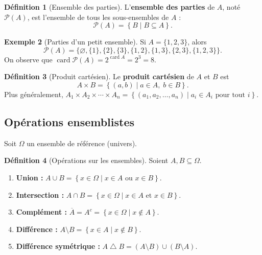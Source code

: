 \documentclass[12pt,a4paper,openany]{book}
\theoremstyle{definition}
\newtheorem{definition}{Définition}[chapter]
\newtheorem{exemple}[definition]{Exemple}
\theoremstyle{plain}
\theoremstyle{remark}
\newcommand{\set}[1]{\left\{#1\right\}}
\newcommand{\powerset}{\mathcal{P}}
\DeclareMathOperator{\card}{card}
\begin{document}
\begin{definition}[Ensemble des parties]\label{def:powerset}
\index{powerset@$\powerset$}
L'\textbf{ensemble des parties} de $A$, noté $\powerset(A)$, est
l'ensemble de tous les sous-ensembles de $A$ :
\[
  \powerset(A) = \set{B \mid B \subseteq A}.
\]
\end{definition}

\begin{exemple}[Parties d'un petit ensemble]\label{ex:parties}
Si $A = \{1, 2, 3\}$, alors
\[
  \powerset(A) = \bigl\{\varnothing, \{1\}, \{2\}, \{3\}, \{1,2\}, \{1,3\}, \{2,3\}, \{1,2,3\}\bigr\}.
\]
On observe que $\card{\powerset(A)} = 2^{\card{A}} = 2^3 = 8$.
\end{exemple}

\begin{definition}[Produit cartésien]\label{def:produit-cartesien}
Le \textbf{produit cartésien} de $A$ et $B$ est
\[
  A \times B = \set{(a, b) \mid a \in A,\; b \in B}.
\]
Plus généralement, $A_1 \times A_2 \times \cdots \times A_n
= \set{(a_1, a_2, \ldots, a_n) \mid a_i \in A_i \text{ pour tout } i}$.
\end{definition}

\subsection{Opérations ensemblistes}

Soit $\Omega$ un ensemble de référence (univers).

\begin{definition}[Opérations sur les ensembles]\label{def:operations-ensembles}
Soient $A, B \subseteq \Omega$.
\begin{enumerate}
  \item \textbf{Union :} $A \cup B = \set{x \in \Omega \mid x \in A \text{ ou } x \in B}$.
  \item \textbf{Intersection :} $A \cap B = \set{x \in \Omega \mid x \in A \text{ et } x \in B}$.
  \item \textbf{Complément :} $\overline{A} = A^c = \set{x \in \Omega \mid x \notin A}$.
  \item \textbf{Différence :} $A \setminus B = \set{x \in A \mid x \notin B}$.
  \item \textbf{Différence symétrique :} $A \bigtriangleup B = (A \setminus B) \cup (B \setminus A)$.
\end{enumerate}
\end{definition}
\end{document}
